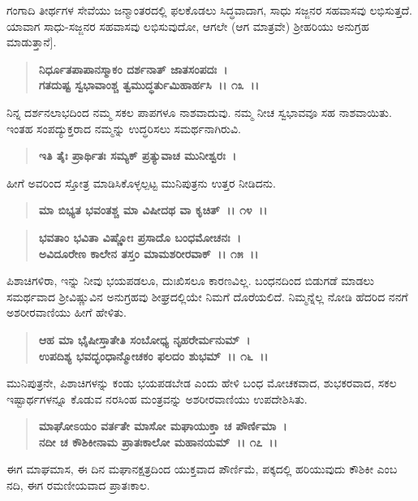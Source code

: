 
ಗಂಗಾದಿ ತೀರ್ಥಗಳ ಸೇವೆಯು ಜನ್ಮಾಂತರದಲ್ಲಿ ಫಲಕೊಡಲು ಸಿದ್ಧವಾದಾಗ, ಸಾಧು ಸಜ್ಜನರ ಸಹವಾಸವು ಲಭಿಸುತ್ತದೆ. ಯಾವಾಗ ಸಾಧು-ಸಜ್ಜನರ ಸಹವಾಸವು ಲಭಿಸುವುದೋ, ಆಗಲೇ (ಆಗ ಮಾತ್ರವೇ) ಶ‍್ರೀಹರಿಯು ಅನುಗ್ರಹ ಮಾಡುತ್ತಾನೆ].

\begin{verse}
\textbf{ನಿರ್ಧೂತಪಾಪಾನಸ್ಮಾಕಂ ದರ್ಶನಾತ್ ಜಾತಸಂಪದಃ~।}\\\textbf{ಗತದುಷ್ಟ ಸ್ವಭಾವಾಂಶ್ಚ ತ್ವಮುದ್ಧರ್ತುಮಿಹಾರ್ಹಸಿ~।। ೧೩~।।}
\end{verse}

ನಿನ್ನ ದರ್ಶನಲಾಭದಿಂದ ನಮ್ಮ ಸಕಲ ಪಾಪಗಳೂ ನಾಶವಾದುವು. ನಮ್ಮ ನೀಚ ಸ್ವಭಾವವೂ ಸಹ ನಾಶವಾಯಿತು. ಇಂತಹ ಸಂಪದ್ಯುಕ್ತರಾದ ನಮ್ಮನ್ನು ಉದ್ಧರಿಸಲು ಸಮರ್ಥನಾಗಿರುವಿ.

\begin{verse}
\textbf{ಇತಿ ತೈಃ ಪ್ರಾರ್ಥಿತಃ ಸಮ್ಯಕ್ ಪ್ರತ್ಯುವಾಚ ಮುನೀಶ್ವರಃ~।}
\end{verse}

ಹೀಗೆ ಅವರಿಂದ ಸ್ತೋತ್ರ ಮಾಡಿಸಿಕೊಳ್ಳಲ್ಪಟ್ಟ ಮುನಿಪುತ್ರನು ಉತ್ತರ ನೀಡಿದನು.

\begin{verse}
\textbf{ಮಾ ಬಿಭ್ಯತ ಭವಂತಶ್ಚ ಮಾ ವಿಷೀದಥ ವಾ ಕೃಚಿತ್~।। ೧೪~।।} 
\end{verse}

\begin{verse}
\textbf{ಭವತಾಂ ಭವಿತಾ ವಿಷ್ಣೋಃ ಪ್ರಸಾದೊ ಬಂಧಮೋಚನಃ~।}\\\textbf{ಅವಿದೂರೇಣ ಕಾಲೇನ ತಸ್ತಂ ಮಾಮಶರೀರವಾಕ್~।। ೧೫~।।}
\end{verse}

ಪಿಶಾಚಿಗಳಿರಾ, ಇನ್ನು ನೀವು ಭಯಪಡಲೂ, ದುಃಖಿಸಲೂ ಕಾರಣವಿಲ್ಲ. ಬಂಧನದಿಂದ ಬಿಡುಗಡೆ ಮಾಡಲು ಸಮರ್ಥವಾದ ಶ‍್ರೀವಿಷ್ಣುವಿನ ಅನುಗ್ರಹವು ಶೀಘ್ರದಲ್ಲಿಯೇ ನಿಮಗೆ ದೊರೆಯಲಿದೆ. ನಿಮ್ಮನ್ನೆಲ್ಲ ನೋಡಿ ಹೆದರಿದ ನನಗೆ ಅಶರೀರವಾಣಿಯು ಹೀಗೆ ಹೇಳಿತು.

\begin{verse}
\textbf{ಆಹ ಮಾ ಭೈಷೀಸ್ತಾತೇತಿ ಸಂಬೋಧ್ಯ ನೃಹರೇರ್ಮನುಮ್~।}\\\textbf{ಉಪದಿಶ್ಯ ಭವದ್ಭಂಧಾನ್ಮೋಚಕಂ ಫಲದಂ ಶುಭಮ್~।। ೧೬~।।}
\end{verse}

ಮುನಿಪುತ್ರನೇ, ಪಿಶಾಚಿಗಳನ್ನು ಕಂಡು ಭಯಪಡಬೇಡ ಎಂದು ಹೇಳಿ ಬಂಧ ಮೋಚಕವಾದ, ಶುಭಕರವಾದ, ಸಕಲ ಇಷ್ಟಾರ್ಥಗಳನ್ನೂ ಕೊಡುವ ನರಸಿಂಹ ಮಂತ್ರವನ್ನು ಅಶರೀರ\-ವಾಣಿಯು ಉಪದೇಶಿಸಿತು.

\begin{verse}
\textbf{ಮಾಘೋಽಯಂ ವರ್ತತೇ ಮಾಸೋ ಮಘಾಯುಕ್ತಾ ಚ ಪೌರ್ಣಿಮಾ~।}\\\textbf{ನದೀ ಚ ಕೌಶಿಕೀನಾಮ ಪ್ರಾತಃಕಾಲೋ ಮಹಾನಯಮ್~।। ೧೭~।।}
\end{verse}

ಈಗ ಮಾಘಮಾಸ, ಈ ದಿನ ಮಘಾನಕ್ಷತ್ರದಿಂದ ಯುಕ್ತವಾದ ಪೌರ್ಣಿಮೆ, ಪಕ್ಕದಲ್ಲಿ ಹರಿಯುವುದು ಕೌಶಿಕೀ ಎಂಬ ನದಿ, ಈಗ ರಮಣೀಯವಾದ ಪ್ರಾತಃಕಾಲ.

